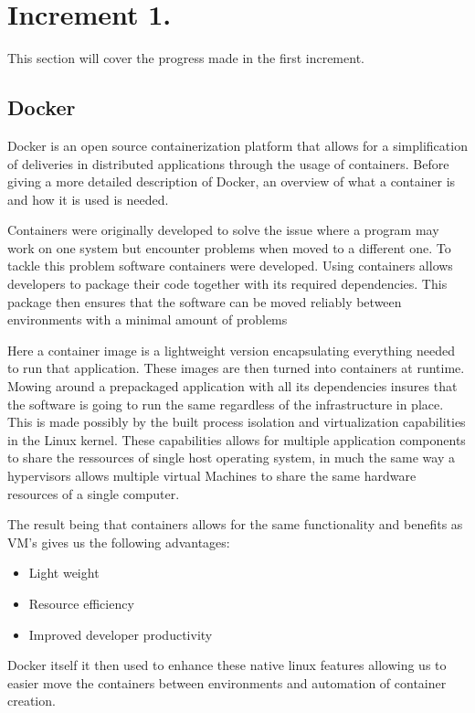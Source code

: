 \section{Increment 1.}
This section will cover the progress made in the first increment. 


\subsection{Docker}
Docker is an open source containerization platform that allows for a simplification of deliveries in distributed applications through the usage of containers. 
Before giving a more detailed description of Docker, an overview of what a container is and how it is used is needed. 


Containers were originally developed to solve the issue where a program may work on one system but encounter problems when moved to a different one. 
To tackle this problem software containers were developed. 
Using containers allows developers to package their code together with its required dependencies. This package then ensures that the software can be moved reliably between environments with a minimal amount of problems


Here a container image is a lightweight version encapsulating everything needed to run that application. These images are then turned into containers at runtime. 
Mowing around a prepackaged application with all its dependencies insures that the software is going to run the same regardless of the infrastructure in place. 
This is made possibly by the built process isolation and virtualization capabilities in the Linux kernel. 
These capabilities allows for multiple application components to share the ressources of single host operating system, 
in much the same way a hypervisors allows multiple virtual Machines to share the same hardware resources of a single computer. 


The result being that containers allows for the same functionality and benefits as VM’s gives us the following advantages:

\begin{itemize}
    \item Light weight 
    \item Resource efficiency
    \item Improved developer productivity
\end{itemize}

Docker itself it then used to enhance these native linux features allowing us to easier move the containers between environments and automation of container creation.

